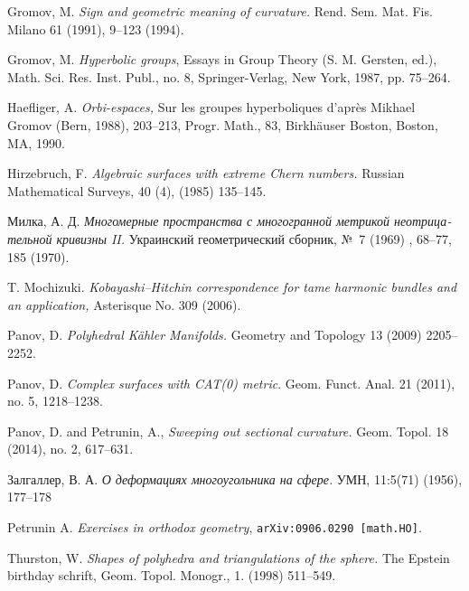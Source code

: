 \documentclass[oneside,a4paper]{article}
\begin{document}
\begin{thebibliography}{52}
 Gromov, M. 
\textit{Sign and geometric meaning of curvature.} 
Rend. Sem. Mat. Fis. Milano 61 (1991), 9--123 (1994). 

 Gromov, M. 
\textit{Hyperbolic groups}, 
Essays in Group Theory (S. M. Gersten, ed.), Math. Sci.
Res. Inst. Publ., no. 8, Springer-Verlag, New York, 1987, pp. 75--264.

Haefliger, A.
\textit{Orbi-espaces,} 
Sur les groupes hyperboliques d'apr\`{e}s Mikhael Gromov (Bern, 1988), 203--213,
Progr. Math., 83, Birk\-h\"auser Boston, Boston, MA, 1990.

 Hirzebruch, F. 
\textit{Algebraic surfaces with extreme Chern numbers.}
Russian Mathematical Surveys, 40 (4), (1985) 135--145.

\begin{otherlanguage}{russian}
Милка, А. Д.
\textit{Многомерные пространства с многогранной метрикой неотрицательной кривизны II.}
Украинский геометрический сборник, №~7 (1969) , 68--77, 185 (1970). 
\end{otherlanguage}


 T. Mochizuki. \textit{Kobayashi--Hitchin correspondence for tame
harmonic bundles and an application,} 
Asterisque No. 309
(2006).


 Panov, D.  \textit{Polyhedral K\"ahler Manifolds.}
Geometry and Topology 13 (2009) 2205--2252.

 Panov, D. \textit{Complex surfaces with {\rm CAT(0)} metric}.
Geom. Funct. Anal. 21 (2011), no. 5, 1218--1238.

 Panov, D. and Petrunin, A., \textit{Sweeping out sectional curvature.}  Geom. Topol. 18 (2014), no. 2, 617--631.

\begin{otherlanguage}{russian}
 Залгаллер, В. А.
\textit{О деформациях многоугольника на сфере.}
УМН, 11:5(71) (1956),  177--178
\end{otherlanguage}

Petrunin A.
\emph{Exercises in orthodox geometry},
{\tt arXiv:0906.0290 [math.HO]}.

 Thurston, W. \textit{Shapes of polyhedra and triangulations of the sphere.} 
The Epstein birthday schrift,  Geom. Topol. Monogr., 1. (1998) 511--549.


\end{thebibliography}
\end{document}
